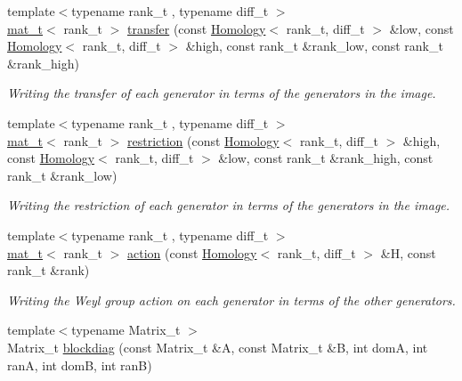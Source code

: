 \begin{DoxyCompactItemize}
\item 
{\footnotesize template$<$typename rank\+\_\+t , typename diff\+\_\+t $>$ }\\\hyperlink{namespaceMackey_a035386035757dade630f685e508e5cf9}{mat\+\_\+t}$<$ rank\+\_\+t $>$ \hyperlink{namespaceMackey_abd5b370902e8b53b32e3fd4e329f068d}{transfer} (const \hyperlink{classMackey_1_1Homology}{Homology}$<$ rank\+\_\+t, diff\+\_\+t $>$ \&low, const \hyperlink{classMackey_1_1Homology}{Homology}$<$ rank\+\_\+t, diff\+\_\+t $>$ \&high, const rank\+\_\+t \&rank\+\_\+low, const rank\+\_\+t \&rank\+\_\+high)
\begin{DoxyCompactList}\small\item\em Writing the transfer of each generator in terms of the generators in the image. \end{DoxyCompactList}\item 
{\footnotesize template$<$typename rank\+\_\+t , typename diff\+\_\+t $>$ }\\\hyperlink{namespaceMackey_a035386035757dade630f685e508e5cf9}{mat\+\_\+t}$<$ rank\+\_\+t $>$ \hyperlink{namespaceMackey_a6818760aa9590810daace862e4c71f04}{restriction} (const \hyperlink{classMackey_1_1Homology}{Homology}$<$ rank\+\_\+t, diff\+\_\+t $>$ \&high, const \hyperlink{classMackey_1_1Homology}{Homology}$<$ rank\+\_\+t, diff\+\_\+t $>$ \&low, const rank\+\_\+t \&rank\+\_\+high, const rank\+\_\+t \&rank\+\_\+low)
\begin{DoxyCompactList}\small\item\em Writing the restriction of each generator in terms of the generators in the image. \end{DoxyCompactList}\item 
{\footnotesize template$<$typename rank\+\_\+t , typename diff\+\_\+t $>$ }\\\hyperlink{namespaceMackey_a035386035757dade630f685e508e5cf9}{mat\+\_\+t}$<$ rank\+\_\+t $>$ \hyperlink{namespaceMackey_aaa66c9857ba86a13949d1b1825ea20f7}{action} (const \hyperlink{classMackey_1_1Homology}{Homology}$<$ rank\+\_\+t, diff\+\_\+t $>$ \&H, const rank\+\_\+t \&rank)
\begin{DoxyCompactList}\small\item\em Writing the Weyl group action on each generator in terms of the other generators. \end{DoxyCompactList}\item 
{\footnotesize template$<$typename Matrix\+\_\+t $>$ }\\Matrix\+\_\+t \hyperlink{namespaceMackey_a6d2d912037da84c6884ac62db997cc0f}{blockdiag} (const Matrix\+\_\+t \&A, const Matrix\+\_\+t \&B, int domA, int ranA, int domB, int ranB)

\end{DoxyCompactItemize}
